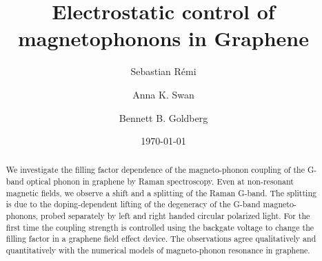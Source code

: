 \documentclass[prl,aps,superscriptaddress,reprint]{revtex4-1}
\begin{document}

\title{Electrostatic control of magnetophonons in Graphene} %



\author{Sebastian R\'{e}mi}
\author{Anna K. Swan}

\author{Bennett B. Goldberg}







\date{\today}

\begin{abstract}
We investigate the filling factor dependence of the magneto-phonon coupling of the G-band optical phonon in graphene by Raman spectroscopy. Even at non-resonant magnetic fields, we observe a shift and a splitting of the Raman G-band. The splitting is due to the doping-dependent lifting of the degeneracy of the G-band magneto-phonons, probed separately by left and right handed circular polarized light. For the first time the coupling strength is controlled using the backgate voltage to change the filling factor in a graphene field effect device. The observations agree qualitatively and quantitatively with the numerical models of magneto-phonon resonance in graphene.
\end{abstract}
\end{document}
